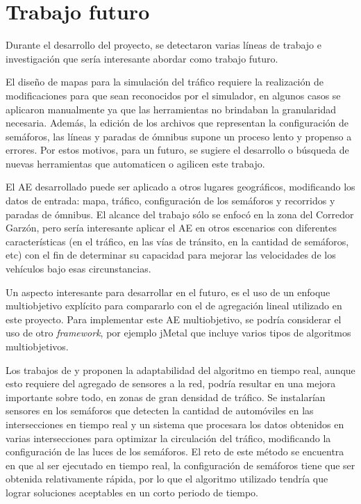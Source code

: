 \newpage
\section{Trabajo futuro}
Durante el desarrollo del proyecto, se detectaron varias líneas de trabajo e investigación que sería interesante abordar como trabajo futuro.

El diseño de mapas para la simulación del tráfico requiere la realización de modificaciones para que sean reconocidos por el simulador, en algunos casos se aplicaron manualmente ya que las herramientas no brindaban la granularidad necesaria. Además, la edición de los archivos que representan la configuración de semáforos, las líneas y paradas de ómnibus supone un proceso lento y propenso a errores. Por estos motivos, para un futuro, se sugiere el desarrollo o búsqueda de nuevas herramientas que automaticen o agilicen este trabajo.

El AE desarrollado puede ser aplicado a otros lugares geográficos, modificando  los datos de entrada: mapa, tráfico, configuración de los semáforos y recorridos y paradas de ómnibus. El alcance del trabajo sólo se enfocó en la zona del Corredor Garzón, pero sería interesante aplicar el AE en otros escenarios con diferentes características (en el tráfico, en las vías de tránsito, en la cantidad de semáforos, etc) con el fin de determinar su capacidad para mejorar las velocidades de los vehículos bajo esas circunstancias.

Un aspecto interesante para desarrollar en el futuro, es el uso de un enfoque multiobjetivo explícito para compararlo con el de agregación lineal utilizado en este proyecto. Para implementar este AE multiobjetivo, se podría considerar el uso de otro \emph{framework}, por ejemplo jMetal que incluye varios tipos de algoritmos multiobjetivos.

Los trabajos de  \citet{Montana1996} y \citet{Vogel2000} proponen la adaptabilidad del algoritmo en tiempo real, aunque esto requiere del agregado de sensores a la red, podría resultar en una mejora importante sobre todo, en zonas de gran densidad de tráfico. Se instalarían sensores en los semáforos que detecten la cantidad de automóviles en las intersecciones en tiempo real y un sistema que procesara los datos obtenidos en varias intersecciones para optimizar la circulación del tráfico, modificando la configuración de las luces de los semáforos. El reto de este método se encuentra en que al ser ejecutado en tiempo real, la configuración de semáforos tiene que ser obtenida relativamente rápida, por lo que el algoritmo utilizado tendría que lograr soluciones aceptables en un corto periodo de tiempo.
